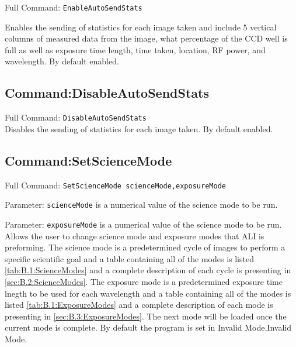 Full Command: \texttt{EnableAutoSendStats}

Enables the sending of statistics for each image taken and include 5 vertical columns of measured data from the image, what percentage of the CCD well is full as well as exposure time length, time taken, location, RF power, and wavelength. By default enabled.

\subsection{Command:DisableAutoSendStats}

Full Command: \texttt{DisableAutoSendStats}\\

Disables the sending of statistics for each image taken. By default enabled.

\subsection{Command:SetScienceMode}

Full Command: \texttt{SetScienceMode scienceMode,exposureMode}

Parameter: \texttt{scienceMode} is a numerical value of the science mode to be run.

Parameter: \texttt{exposureMode} is a numerical value of the science mode to be run.\\

Allows the user to change science mode and exposure modes that ALI is preforming. The science mode is a predetermined cycle of images to perform a specific scientific goal and a table containing all of the modes is listed \autoref{tab:B.1:ScienceModes} and a complete description of each cycle is presenting in \autoref{sec:B.2:ScienceModes}. The exposure mode is a predetermined exposure time lnegth to be used for each wavelength and a table containing all of the modes is listed \autoref{tab:B.1:ExposureModes} and a complete description of each mode is presenting in \autoref{sec:B.3:ExposureModes}. The next mode will be loaded once the current mode is complete. By default the program is set in Invalid Mode,Invalid Mode.

